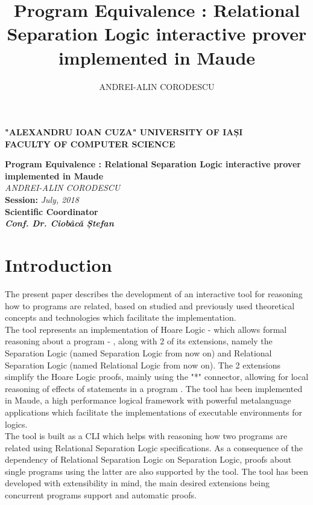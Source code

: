 \documentclass[12pt,a4paper]{article}
\author{ANDREI-ALIN CORODESCU}
\title{Program Equivalence : Relational Separation Logic interactive prover implemented in Maude}
\begin{document}
\begin{titlepage}
\begin{center}
\textbf{
"ALEXANDRU IOAN CUZA" UNIVERSITY OF IAȘI
}
\\
\textbf{FACULTY OF COMPUTER SCIENCE}
\end{center}
   \vspace{40mm}
\begin{center}
	\Large\textbf {Program Equivalence : Relational Separation Logic interactive prover implemented in Maude}\\
	\vspace{40mm}
	\large\textit {ANDREI-ALIN CORODESCU}
	\\
	\vspace{20mm}
	\textbf{Session: }\textit{July, 2018}\\
	\vspace{30mm}
	\textbf{Scientific Coordinator}\\
	\textbf{\textit{Conf. Dr. Ciobâcă Ștefan}}
	\vspace{30mm}
\end{center}
\end{titlepage}
\tableofcontents
\pagebreak

\section{Introduction}
The present paper describes the development of an interactive tool for reasoning how to programs are related, based on studied and previously used theoretical concepts and technologies which facilitate the implementation. \\

The tool represents an implementation of Hoare Logic - which allows formal reasoning about a program - , along  with 2 of its extensions, namely the Separation Logic (named Separation Logic from now on) and Relational Separation Logic \cite{relational} (named Relational Logic from now on). The 2 extensions simplify the Hoare Logic proofs, mainly using the "*" connector, allowing for local reasoning of effects of statements in a program . The tool has been implemented in Maude, a high performance logical framework with powerful metalanguage applications which facilitate the implementations of executable environments for logics.\\

The tool is built as a CLI which helps \cite{primer} \cite{SeparationLogic} \cite{JAVAITP} \cite{REWRITING} \cite{maudeprimer} \cite{manual} \cite{rewrConcurrency} \cite{cyclist} with reasoning how two programs are related using Relational Separation Logic specifications. As a consequence of the dependency of Relational Separation Logic on Separation Logic, proofs about single programs using the latter are also supported by the tool. The tool has been developed with extensibility in mind, the main desired extensions being concurrent programs support and automatic proofs. \\
\end{document}
